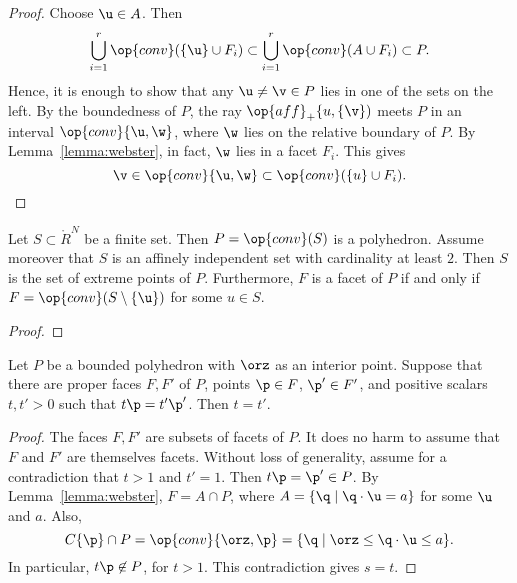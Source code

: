 \begin{proof}
Choose $\u\in A$.   Then
\begin{displaymath}
\bigcup_{i=1}^r \op{conv}(\{\u\}\cup F_i) \subset \bigcup_{i=1}^r \op{conv}(A\cup F_i)\subset P.
\end{displaymath}
Hence, it is enough to show that any $\u\ne\v\in P$ lies in one of the sets on the left.
By the boundedness of $P$, the ray $\op{aff}_+\{u,\{\v\})$ meets $P$ in an interval
$\op{conv}\{\u,\w\}$, where $\w$ lies on the relative boundary of $P$.  By Lemma~\ref{lemma:webster}, in fact, $\w$ lies in a facet $F_i$.  This gives
\begin{displaymath}
 \v\in \op{conv}\{\u,\w\}\subset \op{conv}(\{u\}\cup F_i).
\end{displaymath}
\end{proof}


\begin{lemma}[]\label{lemma:simplex-poly}
  Let $S\subset\ring{R}^N$ be a finite set.  Then $P=\op{conv}(S)$ is
  a polyhedron.  Assume moreover that $S$ is an affinely independent
  set with cardinality at least $2$.  Then $S$ is the set of extreme
  points of $P$. Furthermore,   $F$ is a facet of $P$ if and only if $F =
  \op{conv}(S\setminus \{\u\})$ for some $u\in S$.
\end{lemma}

\begin{proof}
\end{proof}

\begin{lemma}[] \label{lemma:scale} 
Let $P$ be a bounded polyhedron with $\orz$ as an interior point.
Suppose that there are proper faces $F,F'$ of $P$, points $\p\in F$,
$\p'\in F'$, and positive scalars $t,t' >0$ such that $t \p = t' \p'$.
Then $t=t'$.
\end{lemma}

\begin{proof} The faces $F,F'$ are subsets of facets of $P$.  It does
no harm to assume that $F$ and $F'$ are themselves facets.  Without
loss of generality, assume for a contradiction that $t>1$ and $t'=1$.
Then $t\p = \p'\in P$.
By Lemma~\ref{lemma:webster}, $F = A \cap P$, where $A= \{\q
\mid \q\cdot \u = a\}$ for some $\u$ and $a$.  Also,
\begin{displaymath}
C\{\p\}\cap P = \op{conv}\{\orz,\p\} = \{\q \mid \orz\le \q\cdot \u \le a\}.
\end{displaymath}
In particular, $t \p\not\in P$, for $t>1$.  This contradiction gives
$s = t$.
\end{proof}


